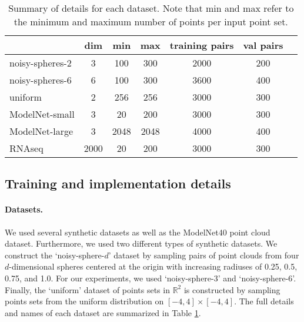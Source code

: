 \documentclass[12pt]{article}
\newcommand{\R}{\mathbb R}
\begin{document}
\begin{table}[t]
    \centering
    \caption{Summary of details for each dataset. Note that min and max refer to the minimum and maximum number of points per input point set. }
    \begin{tabular}{lcccccc}
        \toprule
                      & dim & min & max & training pairs & val pairs \\
        \midrule
        noisy-spheres-2 & 3 & 100 & 300 & 2000 & 200 \\
        noisy-spheres-6 & 6 & 100 & 300 & 3600 & 400 \\
        uniform & 2 & 256 & 256 & 3000 & 300  \\
        ModelNet-small & 3 & 20 & 200 & 3000 & 300 \\
        ModelNet-large & 3 & 2048 & 2048 & 4000 & 400 \\
        RNAseq & 2000 & 20 & 200 &3000 & 300\\
        \bottomrule
    \end{tabular}
    \label{tab:dataset-details}
\end{table}

\subsection{Training and implementation details}
\paragraph{Datasets.} We used several synthetic datasets as well as the ModelNet40 point cloud dataset. Furthermore, we used two different types of synthetic datasets. We construct the `noisy-sphere-$d$' dataset by sampling pairs of point clouds from four $d$-dimensional spheres centered at the origin with increasing radiuses of 0.25, 0.5, 0.75, and 1.0. For our experiments, we used `noisy-sphere-3' and `noisy-sphere-6'. Finally, the `uniform' dataset of points sets in $\R^2$ is constructed by sampling points sets from the uniform distribution on $[-4, 4] \times [-4, 4]$. The full details and names of each dataset are summarized in Table \ref{tab:dataset-details}.
\end{document}
